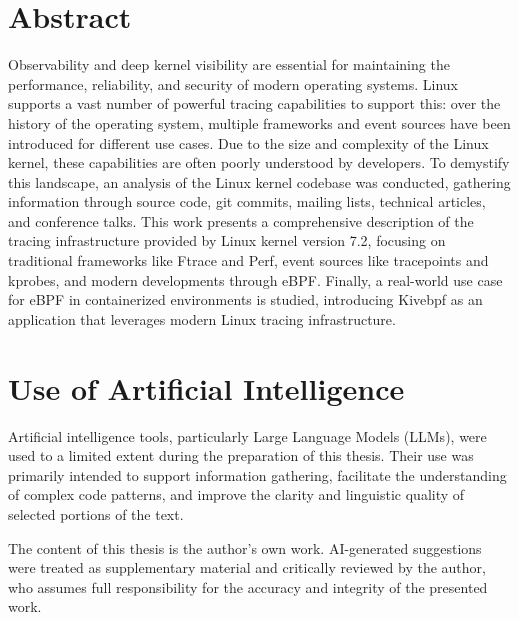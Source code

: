 \chapter*{Abstract}
\label{cha:abtract}





Observability and deep kernel visibility are essential for maintaining the
performance, reliability, and security of modern operating systems. Linux
supports a vast number of powerful tracing capabilities to support this: over
the history of the operating system, multiple frameworks and event sources have
been introduced for different use cases. Due to the size and complexity of the
Linux kernel, these capabilities are often poorly understood by developers. To
demystify this landscape, an analysis of the Linux kernel codebase was
conducted, gathering information through source code, git commits, mailing
lists, technical articles, and conference talks. This work presents a
comprehensive description of the tracing infrastructure provided by Linux kernel
version 7.2, focusing on traditional frameworks like Ftrace and Perf, event
sources like tracepoints and kprobes, and modern developments through eBPF.
Finally, a real-world use case for eBPF in containerized environments is
studied, introducing Kivebpf as an application that leverages modern Linux
tracing infrastructure.

\chapter*{Use of Artificial Intelligence}

Artificial intelligence tools, particularly Large Language Models (LLMs), were
used to a limited extent during the preparation of this thesis. Their use was
primarily intended to support information gathering, facilitate the
understanding of complex code patterns, and improve the clarity and linguistic
quality of selected portions of the text.

The content of this thesis is the author's own work. AI-generated suggestions
were treated as supplementary material and critically reviewed by the author,
who assumes full responsibility for the accuracy and integrity of the presented
work.
